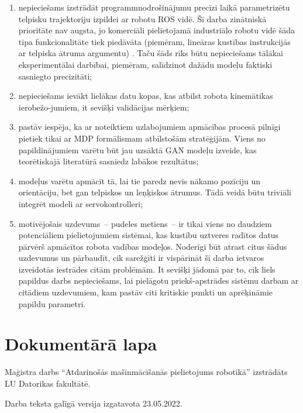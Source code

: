 \documentclass[12pt, a4paper]{article}
\numberwithin{equation}{section} %
\begin{document}
\begin{enumerate}
    \item nepieciešams izstrādāt programmnodrošinājumu precīzi laikā parametrizētu telpisku trajektoriju izpildei ar robotu ROS vidē. Šī darba zinātniskā prioritāte nav augsta, jo komerciāli pielietojamā industriālo robotu vidē šāda tipa funkcionalitāte tiek piedāvāta (piemēram, lineāras kustības instrukcijās ar telpiska ātruma argumentu) \cite{abb_rapid}. Taču šāds rīks būtu nepieciešams tālākai eksperimentālai darbībai, piemēram, salīdzinot dažādu modeļu faktiski sasniegto precizitāti;
    \item nepieciešams ievākt lielākas datu kopas, kas atbilst robota kinemātikas ierobežo-jumiem, it sevišķi validācijas mērķiem;
    \item pastāv iespēja, ka ar noteiktiem uzlabojumiem apmācības procesā pilnīgi pietiek tikai ar MDP formālismam atbilstošām stratēģijām. Viens no papildinājumiem varētu būt jau uzsāktā GAN modeļu izveide, kas teorētiskajā literatūrā sasniedz labākos rezultātus;
    \item modeļus varētu apmācīt tā, lai tie paredz nevis nākamo pozīciju un orientāciju, bet gan telpiskos un leņķiskos ātrumus. Tādā veidā būtu triviāli integrēt modeli ar servokontrolleri;
    \item motivējošais uzdevums~-- pudeles metiens~-- ir tikai viens no daudziem potenciāliem pielietojumiem sistēmai, kas kustību uztveres radītos datus pārvērš apmācītos robota vadības modeļos. Noderīgi būt atrast citus šādus uzdevumus un pārbaudīt, cik sarežģīti ir vispārināt šī darba ietvaros izveidotās iestrādes citām problēmām. It sevišķi jādomā par to, cik liels papildus darbs nepieciešams, lai pielāgotu priekš-apstrādes sistēmu darbam ar citādiem uzdevumiem, kam pastāv citi kritiskie punkti un aprēķināmie papildu parametri.
\end{enumerate}


\newpage
{}
{}
\printbibliography[title=Atsauces]


\newpage
{}
\section*{Dokumentārā lapa}
\thispagestyle{empty}

Maģistra darbs ``Atdarinošās mašīnmācīšanās pielietojums robotikā'' izstrādāts LU Datorikas fakultātē. \bigbreak

Darba teksta galīgā versija izgatavota 23.05.2022. \bigbreak
\end{document}
